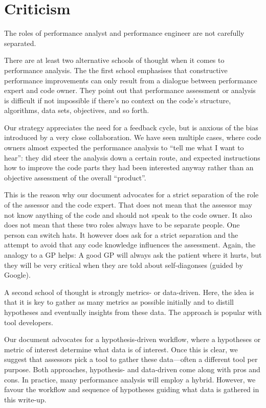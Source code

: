 \section{Criticism}

\begin{assessmentcrime}
 The roles of performance analyst and performance engineer are not carefully separated.
\end{assessmentcrime}


There are at least two alternative schools of thought when it comes to performance analysis.
The the first school emphasises that constructive performance improvements can only result from a dialogue between performance expert and code owner.
They point out that performance assessment or analysis is difficult if not impossible if there's no context on the code's structure, algorithms, data sets, objectives, and so forth.

Our strategy appreciates the need for a feedback cycle, but is anxious of the bias introduced by a very close collaboration.
We have seen multiple cases, where code owners almost expected the performance analysis to ``tell me what I want to hear'':
they did steer the analysis down a certain route, and expected instructions how to improve the code parts they had been interested anyway rather than an objective assessment of the overall ``product''.

This is the reason why our document advocates for a strict separation of the role of the assessor and the code expert.
That does not mean that the assessor may not know anything of the code and should not speak to the code owner.
It also does not mean that these two roles always have to be separate people. 
One person can switch hats.
It however does ask for a strict separation and the attempt to avoid that any code knowledge influences the assessment.
Again, the analogy to a GP helps:
A good GP will always ask the patient where it hurts, but they will be very critical when they are told about self-diagonses (guided by Google).

A second school of thought is strongly metrics- or data-driven.
Here, the idea is that it is key to gather as many metrics as possible initially and to distill hypotheses and eventually insights from these data.
The approach is popular with tool developers.

Our document advocates for a hypothesis-driven workflow, where a hypotheses or metric of interest determine what data is of interest.
Once this is clear, we suggest that assessors pick a tool to gather these data---often a different tool per purpose.
Both approaches, hypothesis- and data-driven come along with pros and cons. 
In practice, many performance analysis will employ a hybrid.
However, we favour the workflow and sequence of hypotheses guiding what data is gathered in this write-up.


